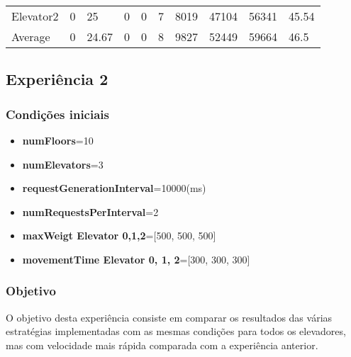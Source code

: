 \documentclass[a4paper]{article}
\begin{document}
\begin{table}[h]
\begin{tabular}{@{}llllllllll@{}}
Elevator2 & 0        & 25            & 0           & 0                                                               & 7                                                                  & 8019                                                         & 47104                                                 & 56341                                                   & 45.54         \\
Average   & 0     & 24.67         & 0        & 0                                                               & 8                                                               & 9827                                                         & 52449                                                 &  59664                                                  & 46.5          \\ \bottomrule
\end{tabular}
\end{table}

\subsection{Experiência 2}

\subsubsection{Condições iniciais}

\begin{itemize}
\item \textbf{numFloors}=10
\item \textbf{numElevators}=3
\item \textbf{requestGenerationInterval}=10000(ms)
\item \textbf{numRequestsPerInterval}=2
\item \textbf{maxWeigt Elevator 0,1,2}=[500, 500, 500]
\item \textbf{movementTime Elevator 0, 1, 2}=[300, 300, 300]
\end{itemize}

\subsubsection{Objetivo} 

O objetivo desta experiência consiste em comparar os resultados das várias estratégias implementadas com as mesmas condições para todos os elevadores, mas com velocidade mais rápida comparada com a experiência anterior.
\end{document}
